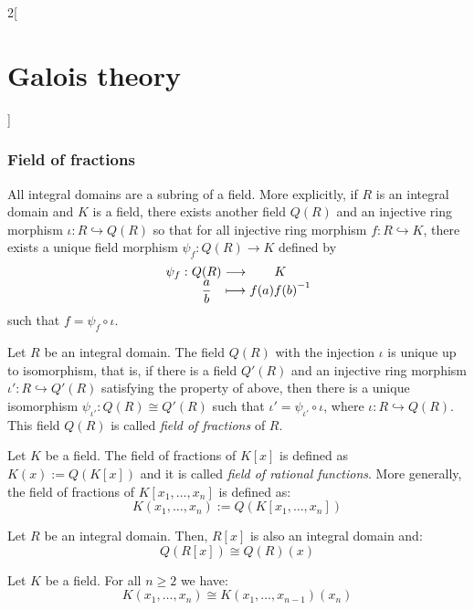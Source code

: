 \documentclass[../../../main.tex]{subfiles}
\begin{document}
\begin{multicols}{2}[\section{Galois theory}]
  \subsubsection{Field of fractions}
  \begin{theorem}
    All integral domains are a subring of a field. More explicitly, if $R$ is an integral domain and $K$ is a field, there exists another field $Q(R)$ and an injective ring morphism $\iota:R\hookrightarrow Q(R)$ so that for all injective ring morphism $f:R\hookrightarrow K$, there exists a unique field morphism $\psi_f:Q(R)\rightarrow K$ defined by
    $$
      \function{\psi_f}{Q(R)}{K}{\displaystyle\frac{a}{b}}{f(a){f(b)}^{-1}}
    $$
    such that $f=\psi_f\circ\iota$.
  \end{theorem}
  \begin{corollary}
    Let $R$ be an integral domain. The field $Q(R)$ with the injection $\iota$ is unique up to isomorphism, that is, if there is a field $Q'(R)$ and an injective ring morphism $\iota':R\hookrightarrow Q'(R)$ satisfying the property of above, then there is a unique isomorphism $\psi_{\iota'}:Q(R)\cong Q'(R)$ such that $\iota'=\psi_{\iota'}\circ\iota$, where $\iota:R\hookrightarrow Q(R)$. This field $Q(R)$ is called \emph{field of fractions} of $R$.
  \end{corollary}
  \begin{definition}
    Let $K$ be a field. The field of fractions of $K[x]$ is defined as $K(x):=Q(K[x])$ and it is called \emph{field of rational functions}. More generally, the field of fractions of $K[x_1,\ldots,x_n]$ is defined as: $$K(x_1,\ldots,x_n):=Q(K[x_1,\ldots,x_n])$$
  \end{definition}
  \begin{lemma}
    Let $R$ be an integral domain. Then, $R[x]$ is also an integral domain and: $$Q(R[x])\cong Q(R)(x)$$
  \end{lemma}
  \begin{corollary}
    Let $K$ be a field. For all $n\geq 2$ we have: $$K(x_1,\ldots,x_n)\cong K(x_1,\ldots,x_{n-1})(x_n)$$
  \end{corollary}

\end{multicols}
\end{document}
